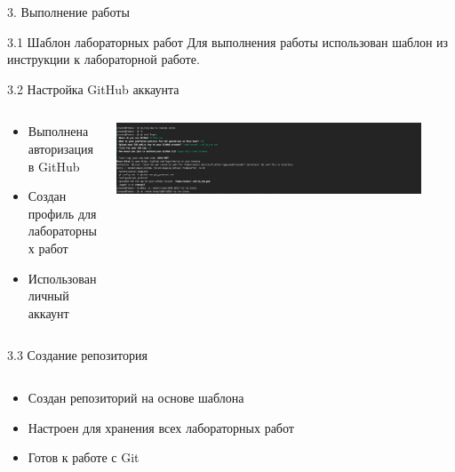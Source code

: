 \documentclass[
  ignorenonframetext,
  aspectratio=169,
]{beamer}
\providecommand{\tightlist}{%
  \setlength{\itemsep}{0pt}\setlength{\parskip}{0pt}}\usepackage{longtable,booktabs,array}
\begin{document}
\begin{frame}[fragile]{3. Выполнение работы}
\label{ux432ux44bux43fux43eux43bux43dux435ux43dux438ux435-ux440ux430ux431ux43eux442ux44b}
\begin{block}{3.1 Шаблон лабораторных работ}
\label{ux448ux430ux431ux43bux43eux43d-ux43bux430ux431ux43eux440ux430ux442ux43eux440ux43dux44bux445-ux440ux430ux431ux43eux442}
Для выполнения работы использован шаблон из инструкции к лабораторной
работе.
\end{block}

\begin{block}{3.2 Настройка GitHub аккаунта}
\label{ux43dux430ux441ux442ux440ux43eux439ux43aux430-github-ux430ux43aux43aux430ux443ux43dux442ux430}
\begin{columns}[c]
\begin{column}{0.6\textwidth}
\begin{itemize}[<+->]
\tightlist
\item
  Выполнена авторизация в GitHub
\item
  Создан профиль для лабораторных работ
\item
  Использован личный аккаунт
\end{itemize}
\end{column}

\begin{column}{0.4\textwidth}
\includegraphics[width=0.9\textwidth,height=\textheight]{./image/gh.png}
\end{column}
\end{columns}
\end{block}

\begin{block}{3.3 Создание репозитория}
\label{ux441ux43eux437ux434ux430ux43dux438ux435-ux440ux435ux43fux43eux437ux438ux442ux43eux440ux438ux44f}
\begin{columns}[c]
\begin{column}{0.6\textwidth}
\begin{itemize}[<+->]
\tightlist
\item
  Создан репозиторий на основе шаблона
\item
  Настроен для хранения всех лабораторных работ
\item
  Готов к работе с Git
\end{itemize}
\end{column}


\end{columns}
\end{block}
\end{frame}
\end{document}
